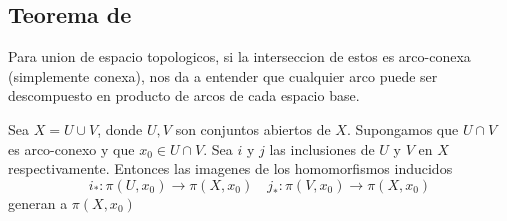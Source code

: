 \subsection{Teorema de \vank}
Para union de espacio topologicos, si la interseccion de estos es
arco-conexa (simplemente conexa), nos da a entender que cualquier arco
puede ser descompuesto en producto de arcos de cada espacio base.
\begin{teorema}
  Sea \(X = U \cup V\), donde \(U,V\) son conjuntos abiertos de \(X\).
  Supongamos que \(U \cap V\) es arco-conexo y que \(x_0 \in U \cap V\).
  Sea \(i\) y \(j\) las inclusiones de \(U\) y \(V\) en \(X\)
  respectivamente. Entonces las imagenes de los homomorfismos inducidos
  \[ i_* : \pi (U, x_0) \to \pi (X, x_0) \quad j_* : \pi (V, x_0) \to
  \pi (X, x_0) \]
  generan a \(\pi (X,x_0)\)
\end{teorema}
